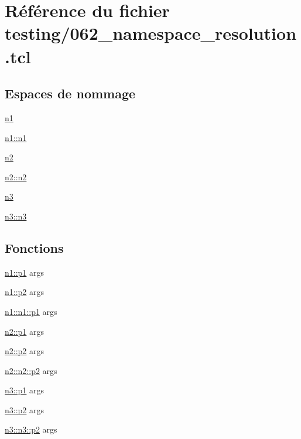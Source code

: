 \hypertarget{062__namespace__resolution_8tcl}{}\section{Référence du fichier testing/062\+\_\+namespace\+\_\+resolution.tcl}
\label{062__namespace__resolution_8tcl}
\subsection*{Espaces de nommage}
\begin{DoxyCompactItemize}
\item 
 \hyperlink{namespacen1}{n1}
\item 
 \hyperlink{namespacen1_1_1n1}{n1\+::n1}
\item 
 \hyperlink{namespacen2}{n2}
\item 
 \hyperlink{namespacen2_1_1n2}{n2\+::n2}
\item 
 \hyperlink{namespacen3}{n3}
\item 
 \hyperlink{namespacen3_1_1n3}{n3\+::n3}
\end{DoxyCompactItemize}
\subsection*{Fonctions}
\begin{DoxyCompactItemize}
\item 
\hyperlink{namespacen1_a9f23d7a7f141915457e8e26023d70cb4}{n1\+::p1} args
\item 
\hyperlink{namespacen1_a0bff29f718fa43e49b7ca79985afb5fa}{n1\+::p2} args
\item 
\hyperlink{namespacen1_1_1n1_ae5735f5a66e607167ba83bcc68366733}{n1\+::n1\+::p1} args
\item 
\hyperlink{namespacen2_a74950c0185232e374220a0707b4903c6}{n2\+::p1} args
\item 
\hyperlink{namespacen2_a49fadfbefa795204a3c566ec76ff632f}{n2\+::p2} args
\item 
\hyperlink{namespacen2_1_1n2_a8d6e41ede87315192a8699f6b9986d26}{n2\+::n2\+::p2} args
\item 
\hyperlink{namespacen3_ae7e87e49507bd56dad087cffecd35b29}{n3\+::p1} args
\item 
\hyperlink{namespacen3_a14e9fe1b27a6d36db9ace2eef4509979}{n3\+::p2} args
\item 
\hyperlink{namespacen3_1_1n3_a386a5db8befb2dbf43baa71a67479253}{n3\+::n3\+::p2} args
\end{DoxyCompactItemize}
